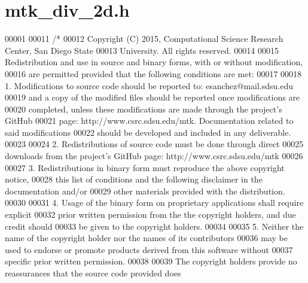 \hypertarget{mtk__div__2d_8h_source}{\section{mtk\+\_\+div\+\_\+2d.\+h}
\label{mtk__div__2d_8h_source}
}

\begin{DoxyCode}
00001 
00011 \textcolor{comment}{/*}
00012 \textcolor{comment}{Copyright (C) 2015, Computational Science Research Center, San Diego State}
00013 \textcolor{comment}{University. All rights reserved.}
00014 \textcolor{comment}{}
00015 \textcolor{comment}{Redistribution and use in source and binary forms, with or without modification,}
00016 \textcolor{comment}{are permitted provided that the following conditions are met:}
00017 \textcolor{comment}{}
00018 \textcolor{comment}{1. Modifications to source code should be reported to: esanchez@mail.sdsu.edu}
00019 \textcolor{comment}{and a copy of the modified files should be reported once modifications are}
00020 \textcolor{comment}{completed, unless these modifications are made through the project's GitHub}
00021 \textcolor{comment}{page: http://www.csrc.sdsu.edu/mtk. Documentation related to said modifications}
00022 \textcolor{comment}{should be developed and included in any deliverable.}
00023 \textcolor{comment}{}
00024 \textcolor{comment}{2. Redistributions of source code must be done through direct}
00025 \textcolor{comment}{downloads from the project's GitHub page: http://www.csrc.sdsu.edu/mtk}
00026 \textcolor{comment}{}
00027 \textcolor{comment}{3. Redistributions in binary form must reproduce the above copyright notice,}
00028 \textcolor{comment}{this list of conditions and the following disclaimer in the documentation and/or}
00029 \textcolor{comment}{other materials provided with the distribution.}
00030 \textcolor{comment}{}
00031 \textcolor{comment}{4. Usage of the binary form on proprietary applications shall require explicit}
00032 \textcolor{comment}{prior written permission from the the copyright holders, and due credit should}
00033 \textcolor{comment}{be given to the copyright holders.}
00034 \textcolor{comment}{}
00035 \textcolor{comment}{5. Neither the name of the copyright holder nor the names of its contributors}
00036 \textcolor{comment}{may be used to endorse or promote products derived from this software without}
00037 \textcolor{comment}{specific prior written permission.}
00038 \textcolor{comment}{}
00039 \textcolor{comment}{The copyright holders provide no reassurances that the source code provided does}

\end{DoxyCode}
